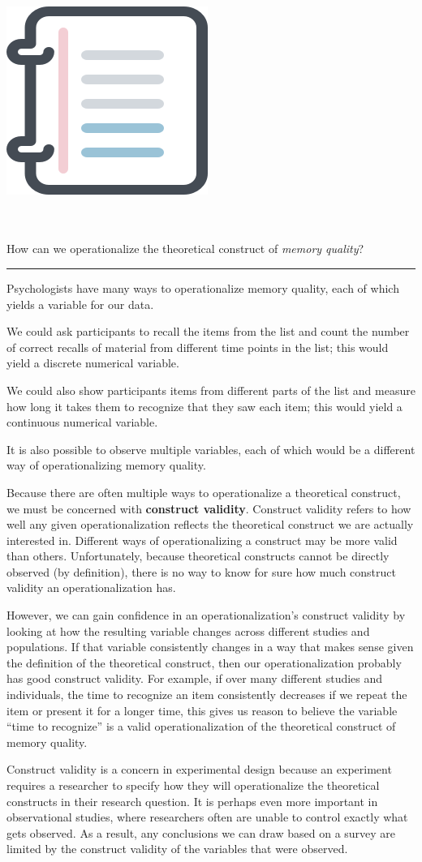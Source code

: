 \documentclass[
  10pt,
  openany]{book}
\newenvironment{mdframedwithfootGPWE}
{   
    \savenotes
    \begin{mdframed}[%
    topline=true, bottomline=true, linecolor=oiB, linewidth=0.5pt,
    rightline=false, leftline=false,
    backgroundcolor=oiLGray]
    \renewcommand{\thempfootnote}{\arabic{footnote}}
    }
{
    \end{mdframed}
    \spewnotes
}
\newenvironment{workedexample}{
    \let\oldrule\rule
    \renewcommand{\rule}[2]{\vspace{-2mm}\oldrule{##1}{##2}\vspace{-2mm}}
\vspace{4mm}
\begin{mdframedwithfootGPWE}
\begin{minipage}[t]{0.10\textwidth}
{$\:$ \\ \setkeys{Gin}{width=2.5em,keepaspectratio}\includegraphics{images/_icons/worked-example.png}}
\end{minipage}
\hfill
\begin{minipage}[t]{0.90\textwidth}
\vspace{-2mm}
\setlength{\parskip}{1em}
\noindent\textbf{\color{oiB}\small\fontfamily{phv}\selectfont{\MakeUppercase{Example}}} $\:$ \\ \\
}{\end{minipage}
\end{mdframedwithfootGPWE}
\vspace{4mm}
}
\begin{document}
\begin{workedexample}
How can we operationalize the theoretical construct of \emph{memory quality}?

\begin{center}\rule{0.5\linewidth}{0.5pt}\end{center}

Psychologists have many ways to operationalize memory quality, each of which yields a variable for our data.

We could ask participants to recall the items from the list and count the number of correct recalls of material from different time points in the list; this would yield a discrete numerical variable.

We could also show participants items from different parts of the list and measure how long it takes them to recognize that they saw each item; this would yield a continuous numerical variable.

It is also possible to observe multiple variables, each of which would be a different way of operationalizing memory quality.

\end{workedexample}

Because there are often multiple ways to operationalize a theoretical construct, we must be concerned with \textbf{construct validity}. Construct validity refers to how well any given operationalization reflects the theoretical construct we are actually interested in. Different ways of operationalizing a construct may be more valid than others. Unfortunately, because theoretical constructs cannot be directly observed (by definition), there is no way to know for sure how much construct validity an operationalization has.

However, we can gain confidence in an operationalization's construct validity by looking at how the resulting variable changes across different studies and populations. If that variable consistently changes in a way that makes sense given the definition of the theoretical construct, then our operationalization probably has good construct validity. For example, if over many different studies and individuals, the time to recognize an item consistently decreases if we repeat the item or present it for a longer time, this gives us reason to believe the variable ``time to recognize'' is a valid operationalization of the theoretical construct of memory quality.

Construct validity is a concern in experimental design because an experiment requires a researcher to specify how they will operationalize the theoretical constructs in their research question. It is perhaps even more important in observational studies, where researchers often are unable to control exactly what gets observed. As a result, any conclusions we can draw based on a survey are limited by the construct validity of the variables that were observed.
\end{document}

